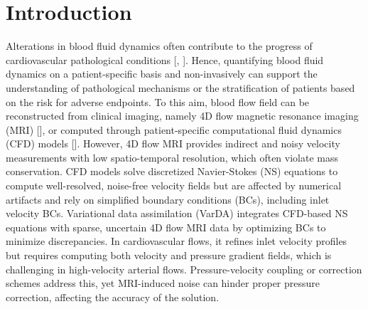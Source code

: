\section*{Introduction}
Alterations in blood fluid dynamics often contribute to the progress of cardiovascular pathological conditions [\cite{Bappoo2021}, \cite{Guzzardi2015}]. Hence, quantifying blood fluid dynamics on a patient-specific basis and non-invasively can support the understanding of pathological mechanisms or the stratification of patients based on the risk for adverse endpoints. To this aim, blood flow field can be reconstructed from clinical imaging, namely 4D flow magnetic resonance imaging (MRI) [\cite{Dyverfeldt2015}], or computed through patient-specific computational fluid dynamics (CFD) models  [\cite{Kheyfets2015}]. 
However, 4D flow MRI provides indirect and noisy velocity measurements with low spatio-temporal resolution, which often violate mass conservation. CFD models solve discretized Navier-Stokes (NS) equations to compute well-resolved, noise-free velocity fields but are affected by numerical artifacts and rely on simplified boundary conditions (BCs), including inlet velocity BCs. Variational data assimilation (VarDA) integrates CFD-based NS equations with sparse, uncertain 4D flow MRI data by optimizing BCs to minimize discrepancies. In cardiovascular flows, it refines inlet velocity profiles but requires computing both velocity and pressure gradient fields, which is challenging in high-velocity arterial flows. Pressure-velocity coupling or correction schemes address this, yet MRI-induced noise can hinder proper pressure correction, affecting the accuracy of the solution.

